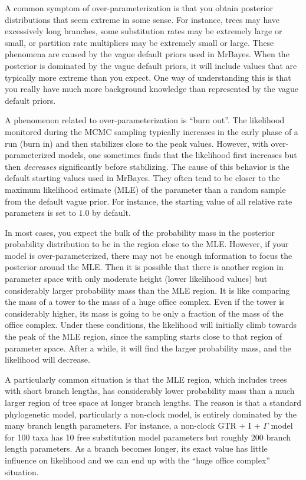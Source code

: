 \documentclass[12pt]{book}
\begin{document}
A common symptom of over-parameterization is that you obtain posterior distributions that seem
extreme in some sense. For instance, trees may have excessively long branches, some substitution
rates may be extremely large or small, or partition rate multipliers may be extremely small or
large. These phenomena are caused by the vague default priors used in MrBayes. When the posterior
is dominated by the vague default priors, it will include values that are typically more extreme
than you expect. One way of understanding this is that you really have much more background
knowledge than represented by the vague default priors.

A phenomenon related to over-parameterization is ``burn out''. The likelihood monitored during the
MCMC sampling typically increases in the early phase of a run (burn in) and then stabilizes close
to the peak values. However, with over-parameterized models, one sometimes finds that the
likelihood first increases but then \emph{decreases} significantly before stabilizing. The cause of
this behavior is the default starting values used in MrBayes. They often tend to be closer to the
maximum likelihood estimate (MLE) of the parameter than a random sample from the default vague
prior. For instance, the starting value of all relative rate parameters is set to $1.0$ by default.

In most cases, you expect the bulk of the probability mass in the posterior probability
distribution to be in the region close to the MLE. However, if your model is over-parameterized,
there may not be enough information to focus the posterior around the MLE. Then it is possible that
there is another region in parameter space with only moderate height (lower likelihood values) but
considerably larger probability mass than the MLE region. It is like comparing the mass of a tower
to the mass of a huge office complex. Even if the tower is considerably higher, its mass is going
to be only a fraction of the mass of the office complex. Under these conditions, the likelihood
will initially climb towards the peak of the MLE region, since the sampling starts close to that
region of parameter space. After a while, it will find the larger probability mass, and the
likelihood will decrease.

A particularly common situation is that the MLE region, which includes trees with short branch
lengths, has considerably lower probability mass than a much larger region of tree space at longer
branch lengths. The reason is that a standard phylogenetic model, particularly a non-clock model,
is entirely dominated by the many branch length parameters. For instance, a non-clock GTR + I +
$\Gamma$ model for 100 taxa has 10 free substitution model parameters but roughly 200 branch length
parameters. As a branch becomes longer, its exact value has little influence on likelihood and we
can end up with the ``huge office complex'' situation.
\end{document}

